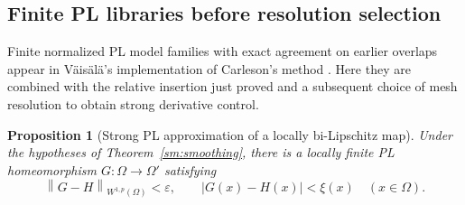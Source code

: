 \documentclass[11pt]{article}
\numberwithin{equation}{section}
\newtheorem{proposition}[theorem]{Proposition}
\theoremstyle{definition}
\theoremstyle{remark}
\begin{document}
\subsection{Finite PL libraries before resolution selection}

Finite normalized PL model families with exact agreement on earlier
overlaps appear in V\"ais\"al\"a's implementation of Carleson's method
\cite[Sections~1.2 and~2.7--2.11]{Vaisala1977}. Here they are combined
with the relative insertion just proved and a subsequent choice of mesh
resolution to obtain strong derivative control.

\begin{proposition}[Strong PL approximation of a locally bi-Lipschitz map]
\label{sm:bilip-pl}
Under the hypotheses of Theorem~\ref{sm:smoothing}, there is a
locally finite PL homeomorphism $G:\Omega\to\Omega'$ satisfying
\[
 \left\lVert G-H\right\rVert_{W^{1,p}(\Omega)}<\varepsilon,
 \qquad |G(x)-H(x)|<\xi(x)\quad(x\in\Omega).
\]
\end{proposition}
\end{document}
